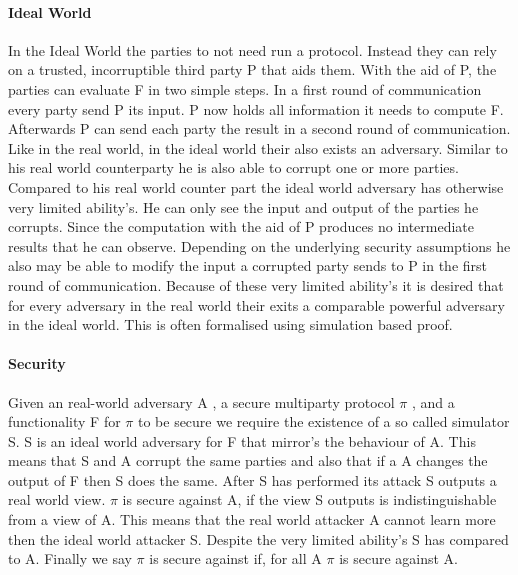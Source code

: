\paragraph{Ideal World}
In the Ideal World the parties to not need run a protocol. Instead they can rely on a trusted, incorruptible third party P that aids them.  With the aid of P, the parties can evaluate F in two simple steps. In a first round of communication every party send P its input. P now holds all information it needs to compute F. Afterwards P can send each party the result in a second round of communication. Like in the real world, in the ideal world their also exists an adversary. Similar to his real world counterparty he is also able to corrupt one or more parties.    Compared to his real world counter part the ideal world adversary has otherwise very limited ability's. He can only see the input and output of the parties he corrupts. Since the computation with the aid of P produces no intermediate results that he can observe. Depending on the underlying security assumptions he also may be able to modify the input a corrupted party sends to P in the first round of communication. Because of these very limited ability's it is desired that for every adversary in the real world their exits a comparable powerful adversary in the ideal world. This is often formalised using simulation based proof.

\paragraph{Security}
Given an real-world adversary A , a secure multiparty protocol $\pi $ , and a functionality F for $\pi $ to be secure we require the existence of a so called simulator S.
S is an ideal world adversary for F that mirror's the behaviour of A. This means that S and A corrupt the same parties and also that if a A changes the output of F then S does the same. After S has performed its attack S outputs a real world view. $\pi $ is secure against A, if the view S outputs is indistinguishable from a view of A. This means that the real world attacker A cannot learn more then the ideal world attacker S. Despite the very limited ability's S has compared to A. Finally we say $\pi $  is secure against if, for all A $\pi $ is secure against A. 






















